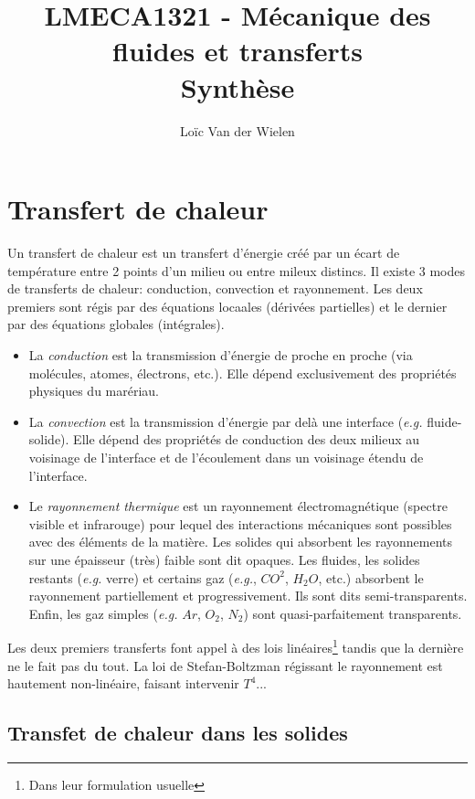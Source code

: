 \documentclass[a4paper,11pt]{report}
\title{LMECA1321 - Mécanique des fluides et transferts\\Synthèse}
\author{Loïc Van der Wielen}
\begin{document}
\maketitle
\tableofcontents


% 

\chapter{Transfert de chaleur}
  Un transfert de chaleur est un transfert d'énergie créé par un écart de température entre 2 points d'un milieu ou entre mileux distincs. Il existe 3 modes de transferts de chaleur: conduction, convection et rayonnement. Les deux premiers sont régis par des équations locaales (dérivées partielles) et le dernier par des équations globales (intégrales).
  \begin{itemize}
    \item La \textit{conduction} est la transmission d'énergie de proche en proche (via molécules, atomes, électrons, etc.). Elle dépend exclusivement des propriétés physiques du marériau.
    \item La \textit{convection} est la transmission d'énergie par delà une interface (\textit{e.g.} fluide-solide). Elle dépend des propriétés de conduction des deux milieux au voisinage de l'interface et de l'écoulement dans un voisinage étendu de l'interface.
    \item Le \textit{rayonnement thermique} est un rayonnement électromagnétique (spectre visible et infrarouge) pour lequel des interactions mécaniques sont possibles avec des éléments de la matière. Les solides qui absorbent les rayonnements sur une épaisseur (très) faible sont dit opaques. Les fluides, les solides restants (\textit{e.g.} verre) et certains gaz (\textit{e.g.}, $CO^2$, $H_2O$, etc.) absorbent le rayonnement partiellement et progressivement. Ils sont dits semi-transparents. Enfin, les gaz simples (\textit{e.g.} $Ar$, $O_2$, $N_2$) sont quasi-parfaitement transparents.
  \end{itemize}

  Les deux premiers transferts font appel à des lois linéaires\footnote{Dans leur formulation usuelle} tandis que la dernière ne le fait pas du tout. La loi de Stefan-Boltzman régissant le rayonnement est hautement non-linéaire, faisant intervenir $T^4$...

  \section{Transfet de chaleur dans les solides}
\end{document}
